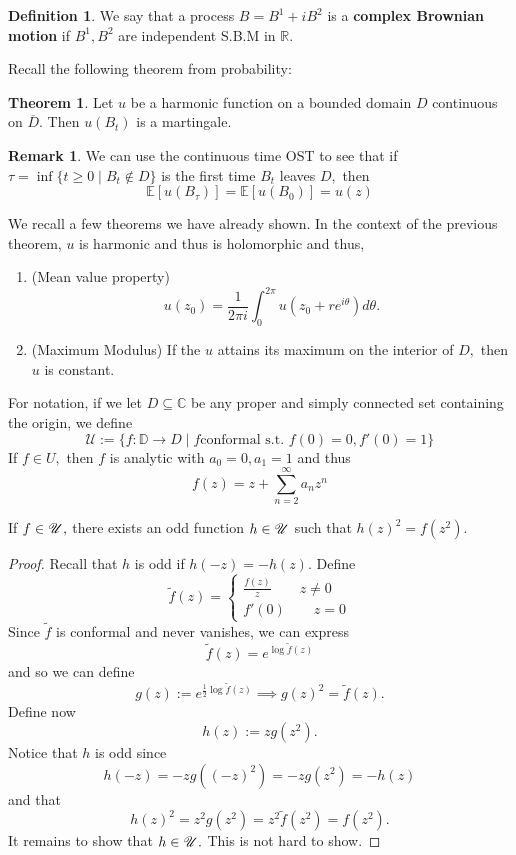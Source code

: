 \documentclass[10pt, oneside]{article}
\newcommand{\bbR}{\mathbb{R}}
\newcommand{\bbC}{\mathbb{C}}
\theoremstyle{definition}
\newtheorem{thm}{Theorem}
\newtheorem{defn}{Definition}
\newtheorem{rem}{Remark}
\newcommand{\bbC}{\mathbb{C}}
\newcommand{\bbE}{\mathbb{E}}
\newcommand{\bbR}{\mathbb{R}}
\begin{document}
\begin{defn}
    We say that a process $B = B^1 + iB^2$ is a \textbf{complex Brownian motion} if $B^1, B^2$ are independent S.B.M in $\bbR.$ 
\end{defn}
Recall the following theorem from probability:
\begin{thm}
    Let $u$ be a harmonic function on a bounded domain $D$ continuous on $\overline{D}.$ Then $u(B_t)$ is a martingale. 
\end{thm}
\begin{rem}
    We can use the continuous time OST to see that if $\tau = \inf\{t \geq 0 \mid B_t  \notin D\}$ is the first time $B_t$ leaves $D,$ then 
    \[\bbE[u(B_\tau)] = \bbE[u(B_0)] = u(z)\]
\end{rem}
We recall a few theorems we have already shown. In the context of the previous theorem, $u$ is harmonic and thus is holomorphic and thus, 
\begin{enumerate}
    \item (Mean value property) \[u(z_0) = \frac{1}{2\pi i}\int_0^{2\pi} u(z_0 + re^{i\theta})d\theta.\]
    \item (Maximum Modulus) If the $u$ attains its maximum on the interior of $D,$ then $u$ is constant. 
\end{enumerate}
For notation, if we let $D \subseteq \bbC$ be any proper and simply connected set containing the origin, we define 
\[\mathcal{U}:= \{f: \mathbb{D}\to D\mid f \text{conformal s.t. } f(0) = 0, f'(0) = 1\}\]
If $f\in U,$ then $f$ is analytic with $a_0 = 0, a_1 = 1$ and thus 
\[f(z) = z+ \sum_{n=2}^\infty a_n z^n\]
\begin{lemma}
    If $f\in \cal U,$ there exists an odd function $h \in \cal U$ such that $h(z)^2 = f(z^2).$
\end{lemma}
\begin{proof}
    Recall that $h$ is odd if $h(-z) = -h(z).$ Define 
    \[\tilde{f}(z) = \begin{cases}
        \frac{f(z)}{z}\qquad z\neq 0\\
        f'(0)\qquad z = 0
    \end{cases}\] Since $\tilde{f}$ is conformal and never vanishes, we can express
    \[\tilde{f}(z)= e^{\log \tilde{f}(z)}\] and so we can define 
    \[g(z) := e^{\frac{1}{2}\log \tilde{ f}(z)} \implies g(z)^2= \tilde{f}(z).\] Define now 
    \[h(z):= zg(z^2).\] Notice that $h$ is odd since 
    \[h(-z) =-zg((-z)^2)= -zg(z^2) = -h(z)\] and that 
    \[h(z)^2 = z^2 g(z^2) = z^2 \tilde{f}(z^2) = f(z^2).\] It remains to show that $h\in \cal U.$ This is not hard to show.
\end{proof}
\end{document}
